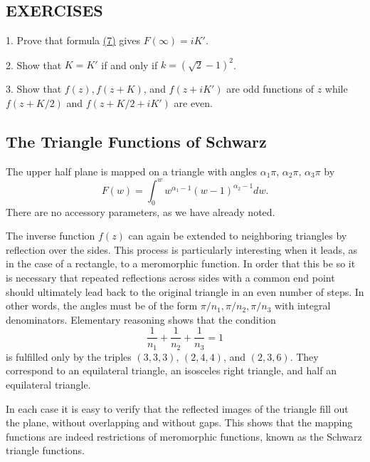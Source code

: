 \subsection*{EXERCISES}
1. Prove that formula \hyperref[eq:6.7]{(7)} gives $F(\infty) = iK'$.

2. Show that $K = K'$ if and only if $k = (\sqrt{2} - 1)^2$.

3. Show that $f(z), f(z + K)$, and $f(z + iK')$ are odd functions of $z$ while $f(z + K / 2)$ and $f(z + K / 2 + iK')$ are even.

\setcounter{section}{2}\setcounter{subsection}{3}\subsection{The Triangle Functions of Schwarz}\label{sec:6.2.4}
The upper half plane is mapped on a triangle with angles $\alpha_{1}\pi$, $\alpha_{2}\pi$, $\alpha_{3}\pi$ by
\begin{equation*}
F (w) = \int_ {0} ^ {w} w ^ {\alpha_ {1} - 1} (w - 1) ^ {\alpha_ {2} - 1} d w.
\end{equation*}
There are no accessory parameters, as we have already noted.

The inverse function $f(z)$ can again be extended to neighboring triangles by reflection over the sides. This process is particularly interesting when it leads, as in the case of a rectangle, to a meromorphic function. In order that this be so it is necessary that repeated reflections across sides with a common end point should ultimately lead back to the original triangle in an even number of steps. In other words, the angles must be of the form $\pi/n_{1}, \pi/n_{2}, \pi/n_{3}$ with integral denominators. Elementary reasoning shows that the condition
\begin{equation*}
\frac {1}{n _ {1}} + \frac {1}{n _ {2}} + \frac {1}{n _ {3}} = 1
\end{equation*}
is fulfilled only by the triples $(3,3,3)$, $(2,4,4)$, and $(2,3,6)$. They correspond to an equilateral triangle, an isosceles right triangle, and half an equilateral triangle.

In each case it is easy to verify that the reflected images of the triangle fill out the plane, without overlapping and without gaps. This shows that the mapping functions are indeed restrictions of meromorphic functions, known as the Schwarz triangle functions.

